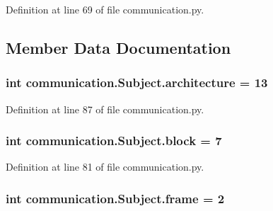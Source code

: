Definition at line 69 of file communication.\+py.



\subsection{Member Data Documentation}
\hypertarget{classcommunication_1_1Subject_a6954f1d0226c57804d26c65220298907}{}
\subsubsection[{architecture}]{\setlength{\rightskip}{0pt plus 5cm}int communication.\+Subject.\+architecture = 13\hspace{0.3cm}{\ttfamily [static]}}\label{classcommunication_1_1Subject_a6954f1d0226c57804d26c65220298907}


Definition at line 87 of file communication.\+py.

\hypertarget{classcommunication_1_1Subject_afef993cc391a8771731201d3a7ce29a1}{}
\subsubsection[{block}]{\setlength{\rightskip}{0pt plus 5cm}int communication.\+Subject.\+block = 7\hspace{0.3cm}{\ttfamily [static]}}\label{classcommunication_1_1Subject_afef993cc391a8771731201d3a7ce29a1}


Definition at line 81 of file communication.\+py.

\hypertarget{classcommunication_1_1Subject_ae2ddaf6ef77f053f68432420b1044402}{}
\subsubsection[{frame}]{\setlength{\rightskip}{0pt plus 5cm}int communication.\+Subject.\+frame = 2\hspace{0.3cm}{\ttfamily [static]}}\label{classcommunication_1_1Subject_ae2ddaf6ef77f053f68432420b1044402}


